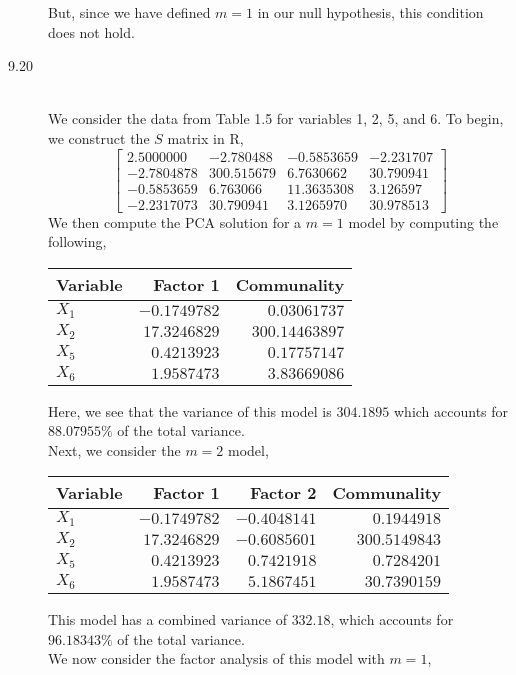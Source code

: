 \documentclass[letterpaper,10pt]{article}
\begin{document}
\begin{description}
But, since we have defined $m=1$ in our null hypothesis, this condition does not hold.
\item[9.20]\hfill\\
We consider the data from Table 1.5 for variables 1, 2, 5, and 6. To begin, we construct the $S$ matrix in R,
\[\begin{bmatrix}
2.5000000 & -2.780488 & -0.5853659 & -2.231707\\
-2.7804878 & 300.515679 & 6.7630662 & 30.790941\\
-0.5853659 &  6.763066 & 11.3635308 & 3.126597\\
-2.2317073 & 30.790941 & 3.1265970 & 30.978513
\end{bmatrix}\]
We then compute the PCA solution for a $m=1$ model by computing the following,
\begin{center}
\begin{tabular}{|l|r|r|}
\hline
Variable & Factor 1 & Communality\\\hline
$X_1$ & $ -0.1749782 $ & $ 0.03061737 $\\
$X_2$ & $ 17.3246829 $ & $ 300.14463897 $\\
$X_5$ & $ 0.4213923 $ & $ 0.17757147 $\\
$X_6$ & $1.9587473$ & $3.83669086$\\\hline
\end{tabular}
\end{center}
Here, we see that the variance of this model is $304.1895$ which accounts for $88.07955\%$ of the total variance.\\
Next, we consider the $m=2$ model,
\begin{center}
\begin{tabular}{|l|r|r|r|}
\hline
Variable & Factor 1 & Factor 2 & Communality\\\hline
$X_1$ & $ -0.1749782 $ & $ -0.4048141 $ & $0.1944918$\\
$X_2$ & $ 17.3246829 $ & $ -0.6085601 $ & $300.5149843$\\
$X_5$ & $ 0.4213923 $ & $ 0.7421918 $ & $0.7284201$\\
$X_6$ & $1.9587473$ & $5.1867451$ & $30.7390159$\\\hline
\end{tabular}
\end{center}
This model has a combined variance of $332.18$, which accounts for $96.18343\%$ of the total variance.\\
We now consider the factor analysis of this model with $m=1$,
\begin{center}

\end{center}
\end{description}
\end{document}
